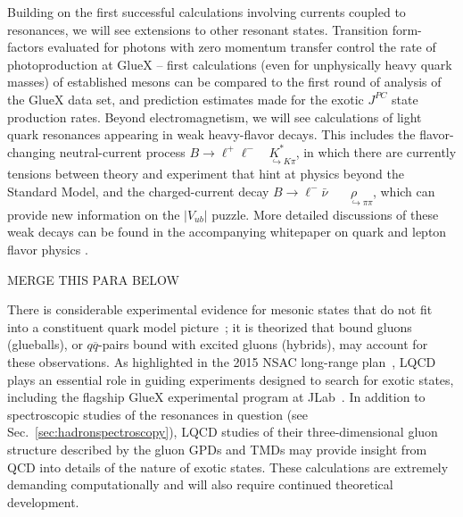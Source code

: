 Building on the first successful calculations involving currents coupled to resonances, we will see extensions to other resonant states. Transition form-factors evaluated for photons with zero momentum transfer control the rate of photoproduction at GlueX -- first calculations (even for unphysically heavy quark masses) of established mesons can be compared to the first round of analysis of the GlueX data set, and prediction estimates made for the exotic $J^{PC}$ state production rates. Beyond electromagnetism, we will see calculations of light quark resonances appearing in weak heavy-flavor decays. This includes the flavor-changing neutral-current process $B \to \ell^+\ell^- \!\!\!\! \underset{\;\;\;\;\;\hookrightarrow K\pi}{K^*}$, in which there are currently tensions between theory and experiment that hint at physics beyond the Standard Model, and the charged-current decay $B \to \ell^-\bar{\nu}  \!\!\!\!\!\!\!\!\;\;\underset{\;\;\;\;\;\;\hookrightarrow \pi\pi}{\rho}$, which can provide new information on the $|V_{ub}|$ puzzle. More detailed discussions of these weak decays can be found in
the accompanying whitepaper on quark and lepton flavor physics \cite{wphep}.






{\color{red} MERGE THIS PARA BELOW}

There is considerable experimental evidence for mesonic states that do not fit into a constituent quark model picture~\cite{Patrignani:2016xqp}; it is theorized that bound gluons (glueballs), or $q\overline{q}$-pairs bound with excited gluons (hybrids), may account for these observations. 
As highlighted in the 2015 NSAC long-range plan~\cite{Geesaman:2015fha}, LQCD plays an essential role in guiding experiments designed to search for exotic states, including the flagship GlueX experimental program at JLab~\cite{Dobbs:2017vjw}. In addition to spectroscopic studies of the resonances in question 
(see Sec.~\ref{sec:hadronspectroscopy}), LQCD studies of their three-dimensional gluon structure described by the gluon GPDs and TMDs may provide insight from QCD into details of the nature of exotic states. These calculations are extremely demanding computationally and will also require continued theoretical development.







